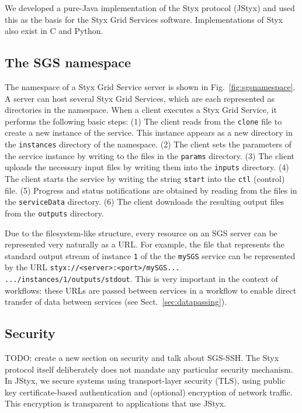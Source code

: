 \documentclass[a4paper]{article}
\begin{document}
We developed a pure-Java implementation of the Styx protocol (JStyx) and used this as the basis for the Styx Grid Services software.  Implementations of Styx also exist in C and Python.

\subsection{The SGS namespace}
The namespace of a Styx Grid Service server is shown in Fig.~\ref{fig:sgsnamespace}.  A server can host several Styx Grid Services, which are each represented as directories in the namespace.  When a client executes a Styx Grid Service, it performs the following basic steps: (1) The client reads from the \texttt{clone} file to create a new instance of the service.  This instance appears as a new directory in the \texttt{instances} directory of the namespace.  (2) The client sets the parameters of the service instance by writing to the files in the \texttt{params} directory.  (3) The client uploads the necessary input files by writing them into the \texttt{inputs} directory.  (4) The client starts the service by writing the string \texttt{start} into the \texttt{ctl} (control) file.  (5) Progress and status notifications are obtained by reading from the files in the \texttt{serviceData} directory.  (6) The client downloads the resulting output files from the \texttt{outputs} directory.

Due to the filesystem-like structure, every resource on an SGS server can be represented very naturally as a URL.  For example, the file that represents the standard output stream of instance \texttt{1} of the the \texttt{mySGS} service can be represented by the URL \texttt{styx://<server>:<port>/mySGS... .../instances/1/outputs/stdout}.  This is very important in the context of workflows: these URLs are passed between services in a workflow to enable direct transfer of data between services (see Sect.~\ref{sec:datapassing}).


\subsection{Security}
TODO: create a new section on security and talk about SGS-SSH.
The Styx protocol itself deliberately does not mandate any particular security mechanism.  In JStyx, we secure systems using transport-layer security (TLS), using public key certificate-based authentication and (optional) encryption of network traffic.  This encryption is transparent to applications that use JStyx.
\end{document}
